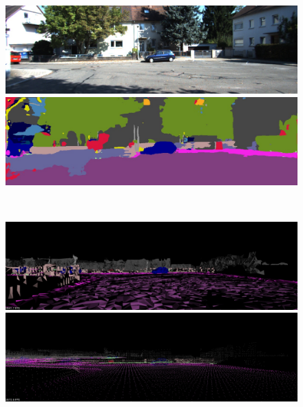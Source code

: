 \begin{figure}[htbp]
 \begin{minipage}[b]{0.50\hsize}
 \begin{center}
  \includegraphics[keepaspectratio, scale=0.18]{./picture/bgrimage/bgrimage10.jpg}
  \end{center}
 \end{minipage}
 \begin{minipage}[b]{0.5\hsize}
 \begin{center}
  \includegraphics[keepaspectratio, scale=0.18]{./picture/segimage/image10.jpg}
  \end{center}
 \end{minipage} \\
 \begin{minipage}[b]{0.50\hsize}
 \begin{center}
  \includegraphics[keepaspectratio, scale=0.18]{./picture/mesh_map_image/image10.jpg}
  \end{center}
 \end{minipage}
 \begin{minipage}[b]{0.50\hsize}
 \begin{center}
  \includegraphics[keepaspectratio, scale=0.18]{./picture/point_map_image/image10.jpg}

\end{center}
\end{minipage}
\end{figure}
